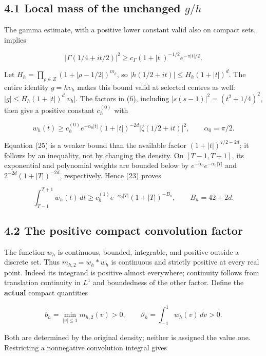 \documentclass[11pt,a4paper]{article}
\begin{document}
\subsection{\texorpdfstring{4.1 Local mass of the unchanged
\(g/h\)}{4.1 Local mass of the unchanged g/h}}\label{local-mass-of-the-unchanged-gh}

The gamma estimate, with a positive lower constant valid also on compact
sets, implies

\[
 |\Gamma(1/4+it/2)|^2
 \ge c_\Gamma(1+|t|)^{-1/2}e^{-\pi|t|/2}.                              \tag{24}
\]

Let \(H_h=\prod_{\rho\in Z}(1+|\rho-1/2|)^{m_\rho}\), so
\(|h(1/2+it)|\le H_h(1+|t|)^d\). The entire identity \(g=hv_h\) makes
this bound valid at selected centres as well:
\(|g|\le H_h(1+|t|)^d|v_h|\). The factors in (6), including
\(|s(s-1)|^2=(t^2+1/4)^2\), then give a positive constant \(c_h^{(0)}\)
with

\[
 w_h(t)\ge c_h^{(0)}e^{-\alpha_0|t|}(1+|t|)^{-2d}
                   |\zeta(1/2+it)|^2,\qquad \alpha_0=\pi/2.            \tag{25}
\]

Equation (25) is a weaker bound than the available factor
\((1+|t|)^{7/2-2d}\); it follows by an inequality, not by changing the
density. On \([T-1,T+1]\), its exponential and polynomial weights are
bounded below by \(e^{-\alpha_0}e^{-\alpha_0|T|}\) and
\(2^{-2d}(1+|T|)^{-2d}\), respectively. Hence (23) proves

\[
 \int_{T-1}^{T+1}w_h(t)\,dt
 \ge c_h^{(1)}e^{-\alpha_0|T|}(1+|T|)^{-B_h},\qquad B_h=42+2d.          \tag{26}
\]

\subsection{4.2 The positive compact convolution
factor}\label{the-positive-compact-convolution-factor}

The function \(w_h\) is continuous, bounded, integrable, and positive
outside a discrete set. Thus \(m_{h,2}=w_h*w_h\) is continuous and
strictly positive at every real point. Indeed its integrand is positive
almost everywhere; continuity follows from translation continuity in
\(L^1\) and boundedness of the other factor. Define the \textbf{actual}
compact quantities

\[
 b_h=\min_{|v|\le1}m_{h,2}(v)>0,\qquad
 \vartheta_h=\int_{-1}^{1}w_h(v)\,dv>0.                                 \tag{27}
\]

Both are determined by the original density; neither is assigned the
value one. Restricting a nonnegative convolution integral gives
\end{document}
